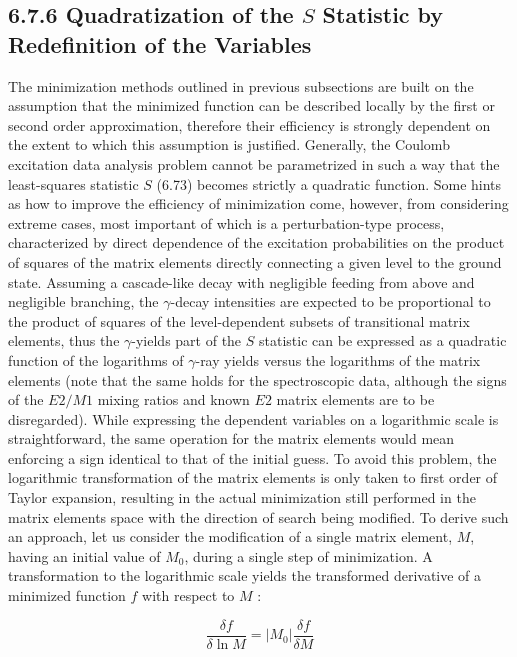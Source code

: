 \documentclass[10pt]{article}
\begin{document}
\subsection*{6.7.6 Quadratization of the $S$ Statistic by Redefinition of the Variables}
The minimization methods outlined in previous subsections are built on the assumption that the minimized function can be described locally by the first or second order approximation, therefore their efficiency is strongly dependent on the extent to which this assumption is justified. Generally, the Coulomb excitation data analysis problem cannot be parametrized in such a way that the least-squares statistic $S$ (6.73) becomes strictly a quadratic function. Some hints as how to improve the efficiency of minimization come, however, from considering extreme cases, most important of which is a perturbation-type process, characterized by direct dependence of the excitation probabilities on the product of squares of the matrix elements directly connecting a given level to the ground state. Assuming a cascade-like decay with negligible feeding from above and negligible branching, the $\gamma$-decay intensities are expected to be proportional to the product of squares of the level-dependent subsets of transitional matrix elements, thus the $\gamma$-yields part of the $S$ statistic can be expressed as a quadratic function of the logarithms of $\gamma$-ray yields versus the logarithms of the matrix elements (note that the same holds for the spectroscopic data, although the signs of the $E 2 / M 1$ mixing ratios and known $E 2$ matrix elements are to be disregarded). While expressing the dependent variables on a logarithmic scale is straightforward, the same operation for the matrix elements would mean enforcing a sign identical to that of the initial guess. To avoid this problem, the logarithmic transformation of the matrix elements is only taken to first order of Taylor expansion, resulting in the actual minimization still performed in the matrix elements space with the direction of search being modified. To derive such an approach, let us consider the modification of a single matrix element, $M$, having an initial value of $M_{0}$, during a single step of minimization. A transformation to the logarithmic scale yields the transformed derivative of a minimized function $f$ with respect to $M$ :


\begin{equation*}
\frac{\delta f}{\delta \ln M}=\left|M_{0}\right| \frac{\delta f}{\delta M} \tag{6.105}
\end{equation*}
\end{document}

